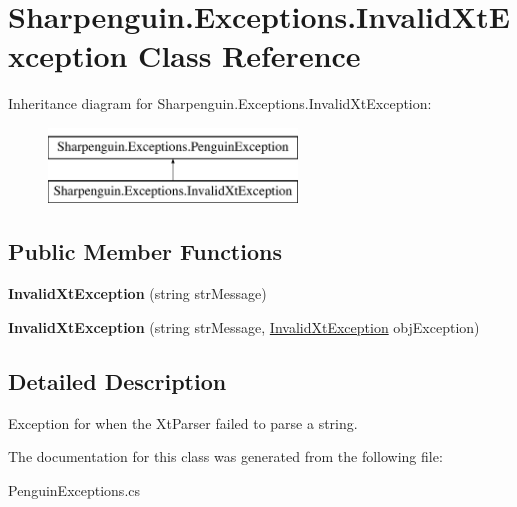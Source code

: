 \hypertarget{classSharpenguin_1_1Exceptions_1_1InvalidXtException}{\section{\-Sharpenguin.\-Exceptions.\-Invalid\-Xt\-Exception \-Class \-Reference}
\label{classSharpenguin_1_1Exceptions_1_1InvalidXtException}
}
\-Inheritance diagram for \-Sharpenguin.\-Exceptions.\-Invalid\-Xt\-Exception\-:\begin{figure}[H]
\begin{center}
\leavevmode
\includegraphics[height=2.000000cm]{classSharpenguin_1_1Exceptions_1_1InvalidXtException}
\end{center}
\end{figure}
\subsection*{\-Public \-Member \-Functions}
\begin{DoxyCompactItemize}
\item 
\hypertarget{classSharpenguin_1_1Exceptions_1_1InvalidXtException_ae678819fe4f70d0490f04615248f4ce4}{{\bfseries \-Invalid\-Xt\-Exception} (string str\-Message)}\label{classSharpenguin_1_1Exceptions_1_1InvalidXtException_ae678819fe4f70d0490f04615248f4ce4}

\item 
\hypertarget{classSharpenguin_1_1Exceptions_1_1InvalidXtException_ac47819418564a31ee3ccc146639c19e0}{{\bfseries \-Invalid\-Xt\-Exception} (string str\-Message, \hyperlink{classSharpenguin_1_1Exceptions_1_1InvalidXtException}{\-Invalid\-Xt\-Exception} obj\-Exception)}\label{classSharpenguin_1_1Exceptions_1_1InvalidXtException_ac47819418564a31ee3ccc146639c19e0}

\end{DoxyCompactItemize}


\subsection{\-Detailed \-Description}
\-Exception for when the \-Xt\-Parser failed to parse a string. 

\-The documentation for this class was generated from the following file\-:\begin{DoxyCompactItemize}
\item 
\-Penguin\-Exceptions.\-cs\end{DoxyCompactItemize}
